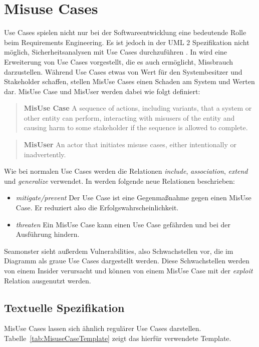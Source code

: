 \section{Misuse Cases}

Use Cases spielen nicht nur bei der Softwareentwicklung eine bedeutende Rolle beim Requirements Engineering. Es ist jedoch in der UML 2 Spezifikation nicht möglich, Sicherheitsanalysen mit Use Cases durchzuführen \cite{sindre2005eliciting}. 
In \cite{sindre2005eliciting} wird eine Erweiterung von Use Cases vorgestellt, die es auch ermöglicht, Missbrauch darzustellen. Während Use Cases etwas von Wert für den Systembesitzer und Stakeholder schaffen, stellen MisUse Cases einen Schaden am System und Werten dar.
MisUse Case und MisUser werden dabei wie folgt definiert:
\begin{quote}
\textbf{MisUse Case} A sequence of actions, including variants, that a system or other entity can perform, interacting with misusers of the entity and causing harm to some stakeholder if the sequence is allowed to complete. \cite{sindre2005eliciting}
\end{quote}

\begin{quote}
\textbf{MisUser} An actor that initiates misuse cases, either intentionally or inadvertently. \cite{sindre2005eliciting}
\end{quote}

Wie bei normalen Use Cases werden die Relationen \textit{include}, \textit{association}, \textit{extend} und \textit{generalize} verwendet.
In \cite{sindre2005eliciting} werden folgende neue Relationen beschrieben:
\begin{itemize}
\item \textit{mitigate/prevent} Der Use Case ist eine Gegenmaßnahme gegen einen MisUse Case. Er reduziert also die Erfolgswahrscheinlichkeit.
\item \textit{threaten} Ein MisUse Case kann einen Use Case gefährden und bei der Ausführung hindern.
\end{itemize}

Seamonster sieht außerdem Vulnerabilities, also Schwachstellen vor, die im Diagramm als graue Use Cases dargestellt werden. Diese Schwachstellen werden von einem Insider verursacht und können von einem MisUse Case mit der \textit{exploit} Relation ausgenutzt werden.

\subsection{Textuelle Spezifikation}
MisUse Cases lassen sich ähnlich regulärer Use Cases darstellen. Tabelle~\ref{tab:MisuseCaseTemplate} zeigt das hierfür verwendete Template. 

